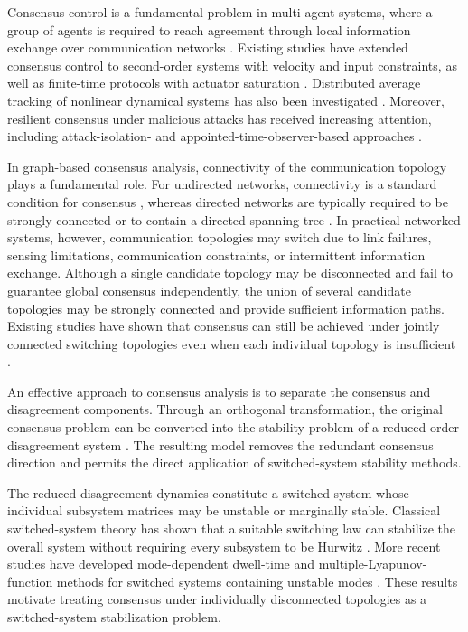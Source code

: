 \documentclass[conference]{IEEEtran}
\begin{document}
	Consensus control is a fundamental problem in multi-agent systems,
	where a group of agents is required to reach agreement through local
	information exchange over communication networks
	\cite{olfati2007}. Existing studies have extended consensus control
	to second-order systems with velocity and input constraints, as well
	as finite-time protocols with actuator saturation
	\cite{fu2019constraints,zhao2015finite}. Distributed average tracking
	of nonlinear dynamical systems has also been investigated
	\cite{zhao2019tracking}. Moreover, resilient consensus under malicious
	attacks has received increasing attention, including attack-isolation-
	and appointed-time-observer-based approaches
	\cite{zhao2022isolation,zhou2022appointed}.
	
	In graph-based consensus analysis, connectivity of the communication
	topology plays a fundamental role. For undirected networks,
	connectivity is a standard condition for consensus
	\cite{olfati2004}, whereas directed networks are typically required
	to be strongly connected or to contain a directed spanning tree
	\cite{jadbabaie2003,ren2005}. In practical networked systems,
	however, communication topologies may switch due to link failures,
	sensing limitations, communication constraints, or intermittent
	information exchange. Although a single candidate topology may be
	disconnected and fail to guarantee global consensus independently,
	the union of several candidate topologies may be strongly connected
	and provide sufficient information paths. Existing studies have shown
	that consensus can still be achieved under jointly connected
	switching topologies even when each individual topology is
	insufficient \cite{cheng2019,li2023}.
	
	An effective approach to consensus analysis is to separate the
	consensus and disagreement components. Through an orthogonal
	transformation, the original consensus problem can be converted into
	the stability problem of a reduced-order disagreement system
	\cite{wang2024protocol}. The resulting model removes the redundant
	consensus direction and permits the direct application of
	switched-system stability methods.
	
	The reduced disagreement dynamics constitute a switched system whose
	individual subsystem matrices may be unstable or marginally stable.
	Classical switched-system theory has shown that a suitable switching
	law can stabilize the overall system without requiring every
	subsystem to be Hurwitz
	\cite{liberzon2003,geromel2006,zhai2001}. More recent studies have
	developed mode-dependent dwell-time and multiple-Lyapunov-function
	methods for switched systems containing unstable modes
	\cite{jin2023,yin2023}. These results motivate treating consensus
	under individually disconnected topologies as a switched-system
	stabilization problem.
	
\end{document}

